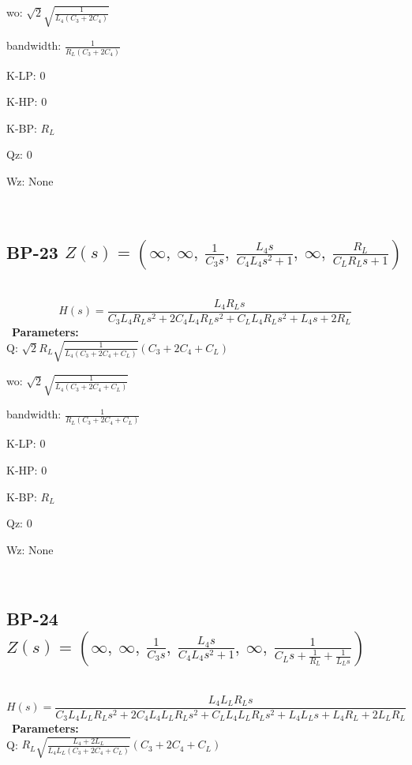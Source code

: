 \documentclass{article}
\begin{document}
wo: $\sqrt{2} \sqrt{\frac{1}{L_{4} \left(C_{3} + 2 C_{4}\right)}}$\ 

bandwidth: $\frac{1}{R_{L} \left(C_{3} + 2 C_{4}\right)}$\ 

K-LP: $0$\ 

K-HP: $0$\ 

K-BP: $R_{L}$\ 

Qz: $0$\ 

Wz: $\text{None}$\ 

\ 

\subsection{BP-23 $Z(s) = \left( \infty, \  \infty, \  \frac{1}{C_{3} s}, \  \frac{L_{4} s}{C_{4} L_{4} s^{2} + 1}, \  \infty, \  \frac{R_{L}}{C_{L} R_{L} s + 1}\right)$ } \ 
\textbf{\[H(s) = \frac{L_{4} R_{L} s}{C_{3} L_{4} R_{L} s^{2} + 2 C_{4} L_{4} R_{L} s^{2} + C_{L} L_{4} R_{L} s^{2} + L_{4} s + 2 R_{L}}\] } \ 
\textbf{Parameters:}\\ 

Q: $\sqrt{2} R_{L} \sqrt{\frac{1}{L_{4} \left(C_{3} + 2 C_{4} + C_{L}\right)}} \left(C_{3} + 2 C_{4} + C_{L}\right)$\ 

wo: $\sqrt{2} \sqrt{\frac{1}{L_{4} \left(C_{3} + 2 C_{4} + C_{L}\right)}}$\ 

bandwidth: $\frac{1}{R_{L} \left(C_{3} + 2 C_{4} + C_{L}\right)}$\ 

K-LP: $0$\ 

K-HP: $0$\ 

K-BP: $R_{L}$\ 

Qz: $0$\ 

Wz: $\text{None}$\ 

\ 

\subsection{BP-24 $Z(s) = \left( \infty, \  \infty, \  \frac{1}{C_{3} s}, \  \frac{L_{4} s}{C_{4} L_{4} s^{2} + 1}, \  \infty, \  \frac{1}{C_{L} s + \frac{1}{R_{L}} + \frac{1}{L_{L} s}}\right)$ } \ 
\textbf{\[H(s) = \frac{L_{4} L_{L} R_{L} s}{C_{3} L_{4} L_{L} R_{L} s^{2} + 2 C_{4} L_{4} L_{L} R_{L} s^{2} + C_{L} L_{4} L_{L} R_{L} s^{2} + L_{4} L_{L} s + L_{4} R_{L} + 2 L_{L} R_{L}}\] } \ 
\textbf{Parameters:}\\ 

Q: $R_{L} \sqrt{\frac{L_{4} + 2 L_{L}}{L_{4} L_{L} \left(C_{3} + 2 C_{4} + C_{L}\right)}} \left(C_{3} + 2 C_{4} + C_{L}\right)$\ 
\end{document}
